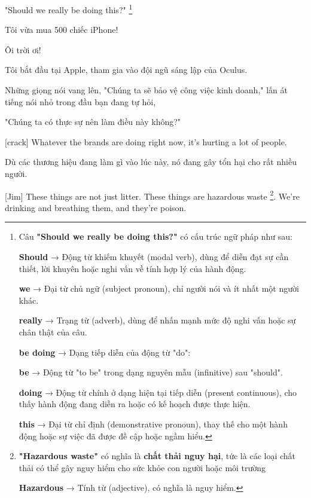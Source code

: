 \documentclass[a4paper]{article}
\begin{document}
	"Should we really be doing this?"  \footnote{
		Câu \textbf{"Should we really be doing this?"} có cấu trúc ngữ pháp như sau:
	
			\textbf{Should} → Động từ khiếm khuyết (modal verb), dùng để diễn đạt sự cần thiết, lời khuyên hoặc nghi vấn về tính hợp lý của hành động.
			
			\textbf{we} → Đại từ chủ ngữ (subject pronoun), chỉ người nói và ít nhất một người khác.
			
			\textbf{really} → Trạng từ (adverb), dùng để nhấn mạnh mức độ nghi vấn hoặc sự chân thật của câu.
			
			\textbf{be doing} → Dạng tiếp diễn của động từ "do":
			
			\textbf{be} → Động từ "to be" trong dạng nguyên mẫu (infinitive) sau "should".
			
			\textbf{doing} → Động từ chính ở dạng hiện tại tiếp diễn (present continuous), cho thấy hành động đang diễn ra hoặc có kế hoạch được thực hiện.
			
			\textbf{this} → Đại từ chỉ định (demonstrative pronoun), thay thế cho một hành động hoặc sự việc đã được đề cập hoặc ngầm hiểu.
		
	}
	
	\begin{vietnamese-v2}
		Tôi vừa mua 500 chiếc iPhone!
		
		Ôi trời ơi!
		
		Tôi bắt đầu tại Apple, tham gia vào đội ngũ sáng lập của Oculus.
		
		Những giọng nói vang lên, "Chúng ta sẽ bảo vệ công việc kinh doanh," lấn át tiếng nói nhỏ trong đầu bạn đang tự hỏi,
		
		"Chúng ta có thực sự nên làm điều này không?"
	\end{vietnamese-v2}
	
	[crack]
	Whatever the brands are doing right now, it's hurting a lot of people.
	
	\begin{vietnamese-v2}
		[Bể nứt]
		
		Dù các thương hiệu đang làm gì vào lúc này, nó đang gây tổn hại cho rất nhiều người.
	\end{vietnamese-v2}
	
	\pagebreak

	[Jim] These things are not just litter. These things are hazardous waste \footnote{
		\textbf{"Hazardous waste"} có nghĩa là \textbf{chất thải nguy hại}, tức là các loại chất thải có thể gây nguy hiểm cho sức khỏe con người hoặc môi trường
		
		\textbf{Hazardous} → Tính từ (adjective), có nghĩa là nguy hiểm.
	
	}. We're drinking and breathing them, and they're poison.
\end{document}
